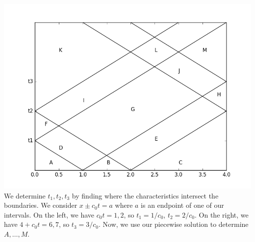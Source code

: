 \documentclass{article}
\begin{document}
\includegraphics[scale=0.5]{problem_3_5.png}\\
We determine $t_1,t_2,t_3$ by finding where the characteristics intersect the boundaries. We consider $x\pm c_0t=a$ where $a$ is an endpoint of one of our intervals. On the left, we have $c_0t=1,2$, so $t_1=1/c_0$, $t_2=2/c_0$. On the right, we have $4+c_0t=6,7$, so $t_3=3/c_0$. Now, we use our piecewise solution to determine $A,\ldots,M$.
\end{document}
